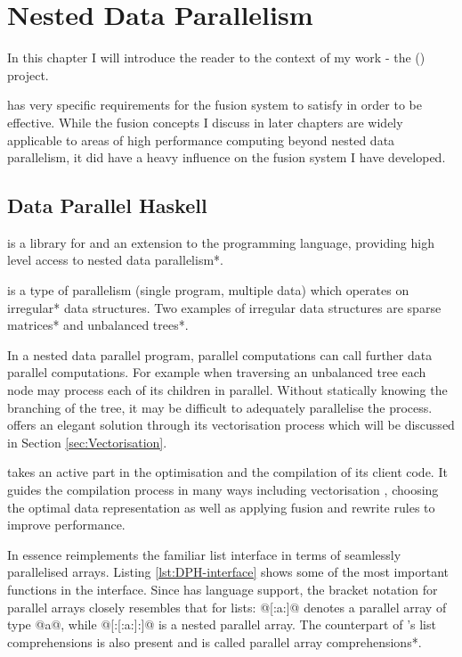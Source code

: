 \documentclass[preamble.tex]{subfiles}
\begin{document}
\clearpage

\chapter{Nested Data Parallelism}

In this chapter I will introduce the reader to the context of my work - the  (\DPH) project.\idph

\DPH has very specific requirements for the fusion system to satisfy in order to be effective. While the fusion concepts I discuss in later chapters are widely applicable to areas of high performance computing beyond nested data parallelism, it did have a heavy influence on the fusion system I have developed.


\section{Data Parallel Haskell}
\label{sec:DPH}

\idph is a library for and an extension to the \Haskell programming language, providing high level access to \*nested data parallelism*.

\indp is a type of  parallelism (single program, multiple data) which operates on \*irregular* data structures. Two examples of irregular data structures are \*sparse matrices* and \*unbalanced trees*.

In a nested data parallel program, parallel computations can call further data parallel computations. For example when traversing an unbalanced tree each node may process each of its children in parallel. Without statically knowing the branching of the tree, it may be difficult to adequately parallelise the process. \DPH offers an elegant solution through its vectorisation process which will be discussed in Section \ref{sec:Vectorisation}.

\DPH takes an active part in the optimisation and the compilation of its client code. It guides the compilation process in many ways including vectorisation \cite{PLKC08}, choosing the optimal data representation \cite{CDL09} as well as applying fusion \cite{CLP+07} and rewrite rules \cite{PTH01} to improve performance.

In essence \DPH reimplements the familiar list interface in terms of seamlessly parallelised arrays. Listing \ref{lst:DPH-interface} shows some of the most important functions in the \DPH interface. Since \DPH has language support, the bracket notation for parallel arrays closely resembles that for \Haskell lists: @[:a:]@ denotes a parallel array of type @a@, while @[:[:a:]:]@ is a nested parallel array. The counterpart of \Haskell's list comprehensions is also present and is called \*parallel array comprehensions*.
\end{document}
